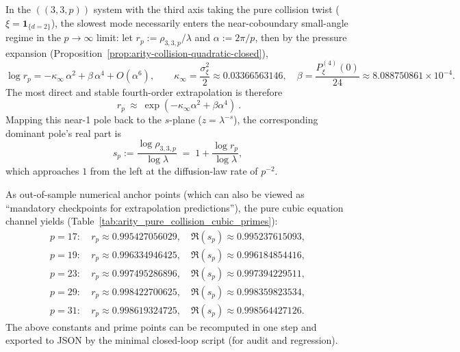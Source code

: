 \begin{remark}\label{rem:arity-335-near-coboundary-scaling}
In the \(((3,3,p))\) system with the third axis taking the pure collision twist (\(\xi=\mathbf{1}_{\{d=2\}}\)),
the slowest mode necessarily enters the near-coboundary small-angle regime in the \(p\to\infty\) limit:
let
\(
r_p:=\rho_{3,3,p}/\lambda
\)
and \(\alpha:=2\pi/p\), then by the pressure expansion (Proposition~\ref{prop:arity-collision-quadratic-closed}),
\[
\log r_p=-\kappa_\infty\,\alpha^2+\beta\,\alpha^4+O(\alpha^6),
\qquad
\kappa_\infty=\frac{\sigma_\xi^2}{2}\approx 0.03366563146,
\quad
\beta=\frac{P_\xi^{(4)}(0)}{24}\approx 8.088750861\times 10^{-4}.
\]
The most direct and stable fourth-order extrapolation is therefore
\[
\boxed{\ r_p\ \approx\ \exp(-\kappa_\infty\alpha^2+\beta\alpha^4)\ }.
\]
Mapping this near-1 pole back to the \(s\)-plane (\(z=\lambda^{-s}\)), the corresponding dominant pole's real part is
\[
s_p:=\frac{\log\rho_{3,3,p}}{\log\lambda}
\;=\;
1+\frac{\log r_p}{\log\lambda},
\]
which approaches \(1\) from the left at the diffusion-law rate of \(p^{-2}\).
\par
As out-of-sample numerical anchor points (which can also be viewed as ``mandatory checkpoints for extrapolation predictions''), the pure cubic equation channel yields (Table~\ref{tab:arity_pure_collision_cubic_primes}):
\[
\begin{aligned}
p=17:&\ r_p\approx 0.995427056029,\quad \Re(s_p)\approx 0.995237615093,\\
p=19:&\ r_p\approx 0.996334946425,\quad \Re(s_p)\approx 0.996184854416,\\
p=23:&\ r_p\approx 0.997495286896,\quad \Re(s_p)\approx 0.997394229511,\\
p=29:&\ r_p\approx 0.998422700625,\quad \Re(s_p)\approx 0.998359823534,\\
p=31:&\ r_p\approx 0.998619324725,\quad \Re(s_p)\approx 0.998564427126.
\end{aligned}
\]
The above constants and prime points can be recomputed in one step and exported to JSON by the minimal closed-loop script  (for audit and regression).
\end{remark}


